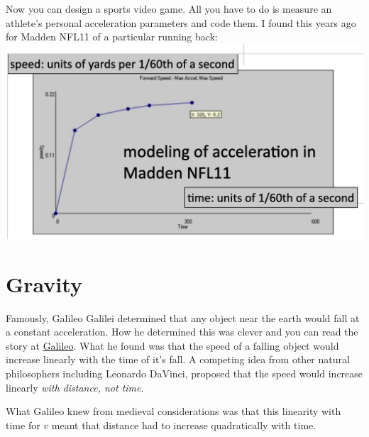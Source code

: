 \documentclass[
  letterpaper,
  DIV=11,
  numbers=noendperiod,
  oneside]{scrreprt}
\begin{document}
Now you can design a sports video game. All you have to do is measure an
athlete's personal acceleration parameters and code them. I found this
years ago for Madden NFL11 of a particular running
back:\includegraphics[width=0.8\linewidth,height=\textheight,keepaspectratio]{mechanics/motion/screenshot_3672.png}

\section{Gravity}\label{gravity}

Famously, Galileo Galilei determined that any object near the earth
would fall at a constant acceleration. How he determined this was clever
and you can read the story at
\href{../../history/galileo_free_fall.qmd}{Galileo}. What he found was
that the speed of a falling object would increase linearly with the time
of it's fall. A competing idea from other natural philosophers including
Leonardo DaVinci, proposed that the speed would increase linearly
\emph{with distance, not time}.

What Galileo knew from medieval considerations was that this linearity
with time for \(v\) meant that distance had to increase quadratically
with time.
\end{document}
